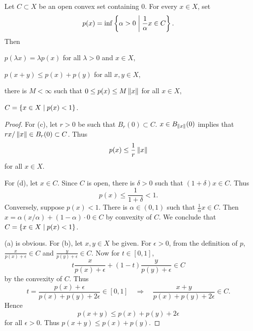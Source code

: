 \begin{lemma}\label{lem:minkowski_functional}
    Let $C\subset X$ be an open convex set containing $0$. For every $x\in X$, set 
    \begin{equation*}
        p(x) = \inf\left\{ \alpha > 0 \;\middle\vert\; \frac{1}{\alpha}x\in C \right\}.
    \end{equation*}
    Then 
    \begin{thmenum}
        \item $p(\lambda x) = \lambda p(x)$ for all $\lambda > 0$ and $x\in X$,
        \item $p(x+y) \leq p(x) + p(y)$ for all $x,y\in X$, 
        \item there is $M<\infty$ such that $0\leq p(x) \leq M\left\lVert {x} \right\rVert$ for all $x\in X$, 
        \item $C = \left\{ x\in X \;\middle\vert\; p(x) < 1 \right\}$. 
    \end{thmenum}
\end{lemma}
\begin{proof}
    For (c), let $r > 0$ be such that $B_r(0)\subset C$. 
    $x\in B_{\left\lVert {x} \right\rVert}(0)$ implies that $rx/\left\lVert {x} \right\rVert\in B_r(0)\subset C$. Thus 
    \begin{equation*}
        p(x) \leq \frac{1}{r}\left\lVert {x} \right\rVert
    \end{equation*}
    for all $x\in X$. 

    For (d), let $x\in C$. Since $C$ is open, there is $\delta > 0$ such that 
    $(1+\delta)x\in C$. Thus 
    \begin{equation*}
        p(x) \leq \frac{1}{1+\delta} < 1. 
    \end{equation*}
    Conversely, suppose $p(x)<1$. There is $\alpha\in (0,1)$ such that $\frac{1}{\alpha}x\in C$. 
    Then $x = \alpha(x/\alpha) + (1-\alpha)\cdot 0\in C$ by convexity of $C$. 
    We conclude that $C = \left\{ x\in X \;\middle\vert\; p(x) < 1 \right\}$. 

    (a) is obvious. For (b), let $x,y\in X$ be given. For $\epsilon > 0$, from 
    the definition of $p$, $\frac{x}{p(x) + \epsilon}\in C$ and $\frac{y}{p(y) + \epsilon}\in C$. 
    Now for $t\in [0,1]$, 
    \begin{equation*}
        t\frac{x}{p(x) + \epsilon} + (1-t)\frac{y}{p(y) + \epsilon} \in C
    \end{equation*}
    by the convexity of $C$. Thus 
    \begin{equation*}
        t = \frac{p(x) + \epsilon}{p(x) + p(y) + 2\epsilon}\in [0,1] 
        \quad\Rightarrow\quad 
        \frac{x+y}{p(x) + p(y) + 2\epsilon} \in C. 
    \end{equation*}
    Hence 
    \begin{equation*}
        p(x+y) \leq p(x) + p(y) + 2\epsilon
    \end{equation*}
    for all $\epsilon > 0$. Thus $p(x+y) \leq p(x) + p(y)$.
\end{proof}

